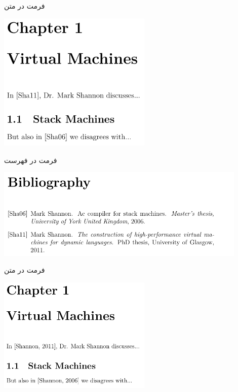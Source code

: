 \begin{frame}{فرمت  در متن}
\begin{center}
\includegraphics[width=0.55\textwidth, height=0.7\textheight]{docs/images/alpha-1}
\end{center}
\end{frame}

\begin{frame}{فرمت  در فهرست}
\begin{center}
\includegraphics[width=0.9\textwidth, height=0.5\textheight]{docs/images/alpha-2}
\end{center}
\end{frame}

\begin{frame}{فرمت  در متن}
\begin{center}
\includegraphics[width=0.55\textwidth, height=0.7\textheight]{docs/images/apalike-1}
\end{center}
\end{frame}

